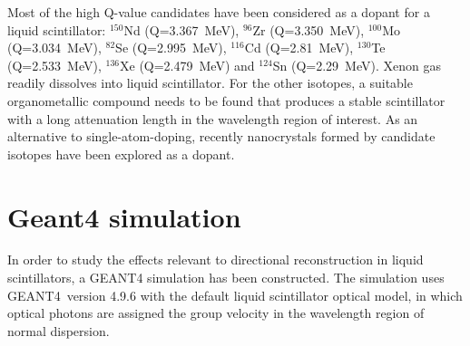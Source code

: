 \documentclass[cits]{JINST}
\newcommand{\GEANT}{GEANT4}
\begin{document}
Most of the high Q-value candidates
have been considered as a dopant for a liquid scintillator:
$^{150}$Nd (Q=3.367~MeV)\cite{minfang,nd1}, $^{96}$Zr (Q=3.350~MeV)\cite{zr1},
$^{100}$Mo (Q=3.034~MeV)\cite{mo1}, $^{82}$Se (Q=2.995~MeV)\cite{qdot},
$^{116}$Cd (Q=2.81~MeV)\cite{qdot, cd1}, $^{130}$Te (Q=2.533~MeV)\cite{qdot, biller},
$^{136}$Xe (Q=2.479~MeV)\cite{KZ0nu} and $^{124}$Sn (Q=2.29~MeV)\cite{sn1}.
Xenon gas readily dissolves into liquid scintillator. For the other isotopes,
a suitable organometallic compound needs to be found that produces a stable
scintillator with a long attenuation length in the wavelength region of
interest. As an alternative to single-atom-doping, recently nanocrystals 
formed by candidate isotopes have been explored as a dopant\cite{qdot,qdot2}.

\section{Geant4 simulation}
\label{sim_section}
In order to study the effects relevant to directional reconstruction
in liquid scintillators, a \GEANT \newline 
\cite{geant4one,geant4two} simulation
has been constructed. The simulation uses \GEANT~version 4.9.6 with the default liquid scintillator
optical model, in which optical photons are
assigned the group velocity in the wavelength region of normal
dispersion.
\end{document}
